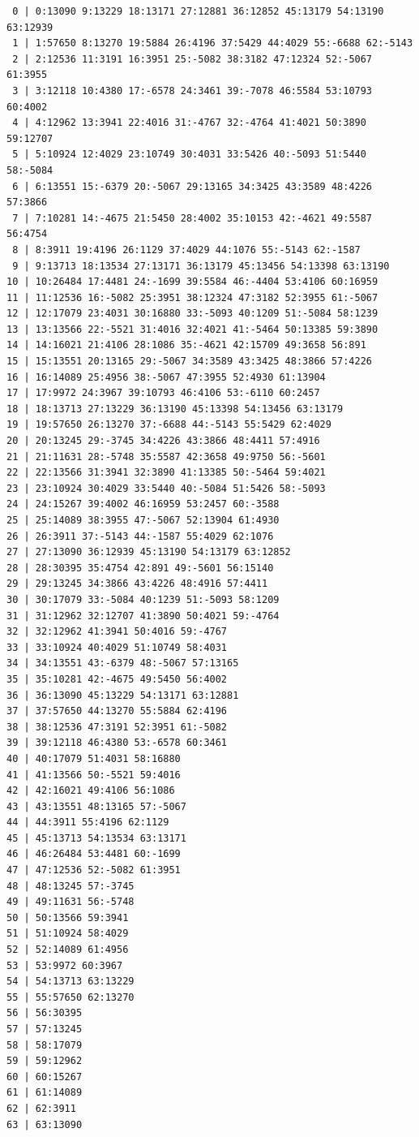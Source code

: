 \documentclass[11pt]{amsart}
\begin{document}
\begin{table}[htbp]
\caption{The $288$ integers on and above the diagonal of $M=N\rho$, $N=1049602$.}
\label{tab:rho}
\begin{center}
\begingroup\scriptsize
\begin{verbatim}
 0 | 0:13090 9:13229 18:13171 27:12881 36:12852 45:13179 54:13190 63:12939
 1 | 1:57650 8:13270 19:5884 26:4196 37:5429 44:4029 55:-6688 62:-5143
 2 | 2:12536 11:3191 16:3951 25:-5082 38:3182 47:12324 52:-5067 61:3955
 3 | 3:12118 10:4380 17:-6578 24:3461 39:-7078 46:5584 53:10793 60:4002
 4 | 4:12962 13:3941 22:4016 31:-4767 32:-4764 41:4021 50:3890 59:12707
 5 | 5:10924 12:4029 23:10749 30:4031 33:5426 40:-5093 51:5440 58:-5084
 6 | 6:13551 15:-6379 20:-5067 29:13165 34:3425 43:3589 48:4226 57:3866
 7 | 7:10281 14:-4675 21:5450 28:4002 35:10153 42:-4621 49:5587 56:4754
 8 | 8:3911 19:4196 26:1129 37:4029 44:1076 55:-5143 62:-1587
 9 | 9:13713 18:13534 27:13171 36:13179 45:13456 54:13398 63:13190
10 | 10:26484 17:4481 24:-1699 39:5584 46:-4404 53:4106 60:16959
11 | 11:12536 16:-5082 25:3951 38:12324 47:3182 52:3955 61:-5067
12 | 12:17079 23:4031 30:16880 33:-5093 40:1209 51:-5084 58:1239
13 | 13:13566 22:-5521 31:4016 32:4021 41:-5464 50:13385 59:3890
14 | 14:16021 21:4106 28:1086 35:-4621 42:15709 49:3658 56:891
15 | 15:13551 20:13165 29:-5067 34:3589 43:3425 48:3866 57:4226
16 | 16:14089 25:4956 38:-5067 47:3955 52:4930 61:13904
17 | 17:9972 24:3967 39:10793 46:4106 53:-6110 60:2457
18 | 18:13713 27:13229 36:13190 45:13398 54:13456 63:13179
19 | 19:57650 26:13270 37:-6688 44:-5143 55:5429 62:4029
20 | 20:13245 29:-3745 34:4226 43:3866 48:4411 57:4916
21 | 21:11631 28:-5748 35:5587 42:3658 49:9750 56:-5601
22 | 22:13566 31:3941 32:3890 41:13385 50:-5464 59:4021
23 | 23:10924 30:4029 33:5440 40:-5084 51:5426 58:-5093
24 | 24:15267 39:4002 46:16959 53:2457 60:-3588
25 | 25:14089 38:3955 47:-5067 52:13904 61:4930
26 | 26:3911 37:-5143 44:-1587 55:4029 62:1076
27 | 27:13090 36:12939 45:13190 54:13179 63:12852
28 | 28:30395 35:4754 42:891 49:-5601 56:15140
29 | 29:13245 34:3866 43:4226 48:4916 57:4411
30 | 30:17079 33:-5084 40:1239 51:-5093 58:1209
31 | 31:12962 32:12707 41:3890 50:4021 59:-4764
32 | 32:12962 41:3941 50:4016 59:-4767
33 | 33:10924 40:4029 51:10749 58:4031
34 | 34:13551 43:-6379 48:-5067 57:13165
35 | 35:10281 42:-4675 49:5450 56:4002
36 | 36:13090 45:13229 54:13171 63:12881
37 | 37:57650 44:13270 55:5884 62:4196
38 | 38:12536 47:3191 52:3951 61:-5082
39 | 39:12118 46:4380 53:-6578 60:3461
40 | 40:17079 51:4031 58:16880
41 | 41:13566 50:-5521 59:4016
42 | 42:16021 49:4106 56:1086
43 | 43:13551 48:13165 57:-5067
44 | 44:3911 55:4196 62:1129
45 | 45:13713 54:13534 63:13171
46 | 46:26484 53:4481 60:-1699
47 | 47:12536 52:-5082 61:3951
48 | 48:13245 57:-3745
49 | 49:11631 56:-5748
50 | 50:13566 59:3941
51 | 51:10924 58:4029
52 | 52:14089 61:4956
53 | 53:9972 60:3967
54 | 54:13713 63:13229
55 | 55:57650 62:13270
56 | 56:30395
57 | 57:13245
58 | 58:17079
59 | 59:12962
60 | 60:15267
61 | 61:14089
62 | 62:3911
63 | 63:13090
\end{verbatim}
\endgroup
\end{center}
\end{table}
\end{document}
